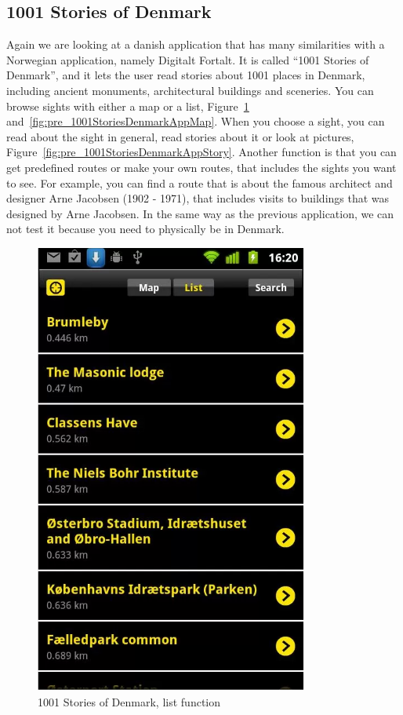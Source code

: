 \documentclass[11pt]{book}
\begin{document}
\subsection{1001 Stories of Denmark}
Again we are looking at a danish application that has many similarities with a Norwegian application, namely Digitalt Fortalt. It is called ``1001 Stories of Denmark'', and it lets the user read stories about 1001 places in Denmark, including ancient monuments, architectural buildings and sceneries. You can browse sights with either a map or a list, Figure~\ref{fig:pre_1001StoriesDenmarkAppList} and~\ref{fig:pre_1001StoriesDenmarkAppMap}. When you choose a sight, you can read about the sight in general, read stories about it or look at pictures, Figure~\ref{fig:pre_1001StoriesDenmarkAppStory}. Another function is that you can get predefined routes or make your own routes, that includes the sights you want to see. For example, you can find a route that is about the famous architect and designer Arne Jacobsen (1902 - 1971), that includes visits to buildings that was designed by Arne Jacobsen. In the same way as the previous application, we can not test it because you need to physically be in Denmark.

\begin{figure}[H]
      \centering
      \includegraphics[width=0.8\textwidth]{Figures/Prestudy/1001storiesList.png}
      \caption{1001 Stories of Denmark, list function}
      \label{fig:pre_1001StoriesDenmarkAppList}
\end{figure}
\end{document}
